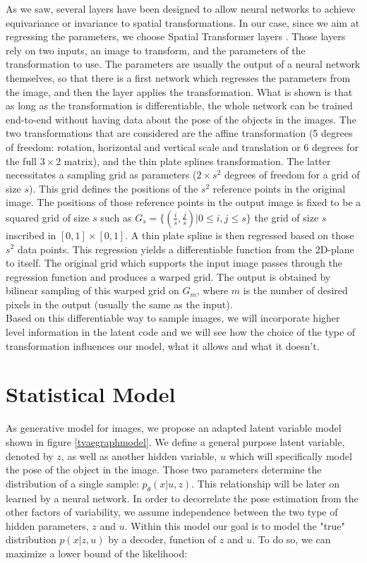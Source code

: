\documentclass[letterpaper, twoside]{article}
\begin{document}
    As we saw, several layers have been designed to allow neural networks to achieve equivariance or invariance to spatial transformations. In our case, since we aim at regressing the parameters, we choose Spatial Transformer layers \cite{Jaderberg.stn}. Those layers rely on two inputs, an image to transform, and the parameters of the transformation to use. The parameters are usually the output of a neural network themselves, so that there is a first network which regresses the parameters from the image, and then the layer applies the transformation. What is shown is that as long as the transformation is differentiable, the whole network can be trained end-to-end without having data about the pose of the objects in the images. The two transformations that are considered are the affine transformation (5 degrees of freedom: rotation, horizontal and vertical scale and translation or 6 degrees for the full $3\times 2$ matrix), and the thin plate splines transformation. The latter necessitates a sampling grid as parameters ($2 \times s^2$ degrees of freedom for a grid of size $s$). This grid defines the positions of the $s^2$ reference points in the original image. The positions of those reference points in the output image is fixed to be a squared grid of size $s$ such as $G_s = \{(\frac{i}{s}, \frac{j}{s}) | 0 \leq i,j \leq s\}$ the grid of size $s$ inscribed in $[0, 1] \times [0, 1]$. A thin plate spline is then regressed based on those $s^2$ data points. This regression yields a differentiable function from the 2D-plane to itself. The original grid which supports the input image passes through the regression function and produces a warped grid. The output is obtained by bilinear sampling of this warped grid on $G_m$, where $m$ is the number of desired pixels in the output (usually the same as the input).\\

    Based on this differentiable way to sample images, we will incorporate higher level information in the latent code and we will see how the choice of the type of transformation influences our model, what it allows and what it doesn't.

\section{Statistical Model}
    As generative model for images, we propose an adapted latent variable model shown in figure \ref{tvaegraphmodel}. We define a general purpose latent variable, denoted by $z$, as well as another hidden variable, $u$ which will specifically model the pose of the object in the image. Those two parameters determine the distribution of a single sample: $p_\theta(x|u,z)$. This relationship will be later on learned by a neural network. In order to decorrelate the pose estimation from the other factors of variability, we assume independence between the two type of hidden parameters, $z$ and $u$.
    Within this model our goal is to model the "true" distribution $p(x|z,u)$ by a decoder, function of $z$ and $u$. To do so, we can maximize a lower bound of the likelihood:
\end{document}
